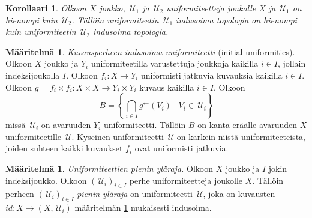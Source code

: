 \documentclass[12pt,a4paper,leqno]{report}
\newcommand{\U}{\,\mathcal{U}}
\theoremstyle{plain}
\newtheorem{kor}[equation]{Korollaari}
\theoremstyle{definition}
\newtheorem{maar}[equation]{Määritelmä}
\theoremstyle{remark}
\begin{document}
\begin{kor}
Olkoon $X$ joukko, $\U_1$ ja $\U_2$ uniformiteetteja joukolle $X$ ja 
$\U_1$ on hienompi kuin $\U_2$. 
Tällöin uniformiteetin $\U_1$ indusoima topologia on hienompi kuin 
uniformiteetin $\U_2$ indusoima topologia.
\end{kor}
\begin{maar}\label{kuvausperheen indusoima}
\emph{Kuvausperheen indusoima uniformiteetti} (initial uniformities).
Olkoon $X$ joukko ja $Y_i$ uniformiteetilla varustettuja joukkoja kaikilla $i\in I$, jollain indeksijoukolla $I$. 
Olkoon $f_i\colon X\rightarrow Y_i$ uniformisti jatkuvia kuvauksia kaikilla $i\in I$. 
Olkoon $g=f_i\times f_i\colon X\times X\rightarrow Y_i\times Y_i$ %
kuvaus kaikilla $i\in I$.
Olkoon $$B=\left\{\bigcap_{i\in I}g^{\leftarrow}(V_i)\mid V_i \in\U_i \right\}$$
missä $\U_i$ on avaruuden $Y_i$ uniformiteetti.
Tällöin $B$ on kanta eräälle avaruuden $X$ uniformiteetille $\U$. 
Kyseinen uniformiteetti $\U$ on karkein niistä uniformiteeteista, joiden suhteen kaikki kuvaukset $f_i$ ovat uniformisti jatkuvia.
\end{maar}
\begin{maar}
\emph{Uniformiteettien pienin yläraja.}
Olkoon $X$ joukko ja $I$ jokin indeksijoukko.
Olkoon $(\U_i)_{i\in I}$ perhe uniformiteetteja joukolle $X$.
Tällöin perheen $(\U_i)_{i\in I}$ \emph{pienin yläraja} on uniformiteetti $\U$, joka on kuvausten $id\colon X\rightarrow (X,\U_i)$ määritelmän \ref{kuvausperheen indusoima} mukaisesti indusoima.
\end{maar}
\end{document}
